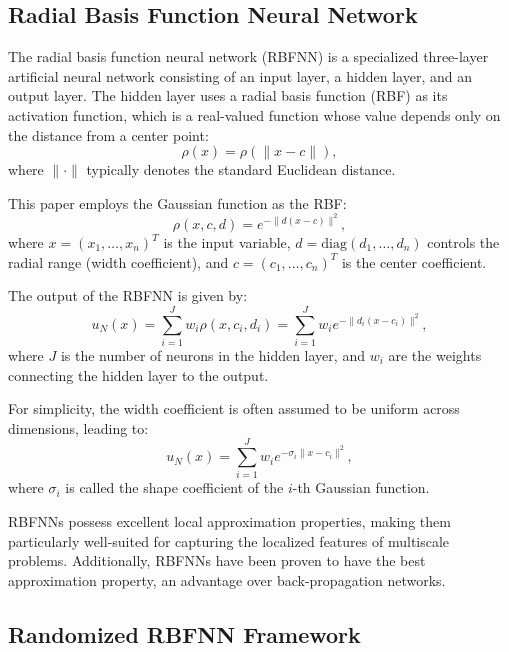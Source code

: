 \documentclass[11pt]{article}
\begin{document}
\subsection{Radial Basis Function Neural Network}

The radial basis function neural network (RBFNN) is a specialized three-layer artificial neural network consisting of an input layer, a hidden layer, and an output layer. The hidden layer uses a radial basis function (RBF) as its activation function, which is a real-valued function whose value depends only on the distance from a center point:
\begin{equation}
\rho(x) = \rho(\|x - c\|),
\end{equation}
where $\|\cdot\|$ typically denotes the standard Euclidean distance.

This paper employs the Gaussian function as the RBF:
\begin{equation}
\rho(x, c, d) = e^{-\|d(x-c)\|^2},
\end{equation}
where $x = (x_1, \ldots, x_n)^T$ is the input variable, $d = \text{diag}(d_1, \ldots, d_n)$ controls the radial range (width coefficient), and $c = (c_1, \ldots, c_n)^T$ is the center coefficient.

The output of the RBFNN is given by:
\begin{equation}
u_N(x) = \sum_{i=1}^J w_i \rho(x, c_i, d_i) = \sum_{i=1}^J w_i e^{-\|d_i(x-c_i)\|^2},
\end{equation}
where $J$ is the number of neurons in the hidden layer, and $w_i$ are the weights connecting the hidden layer to the output.

For simplicity, the width coefficient is often assumed to be uniform across dimensions, leading to:
\begin{equation}
u_N(x) = \sum_{i=1}^J w_i e^{-\sigma_i\|x-c_i\|^2},
\end{equation}
where $\sigma_i$ is called the shape coefficient of the $i$-th Gaussian function.

RBFNNs possess excellent local approximation properties, making them particularly well-suited for capturing the localized features of multiscale problems. Additionally, RBFNNs have been proven to have the best approximation property, an advantage over back-propagation networks.

\subsection{Randomized RBFNN Framework}
\end{document}
